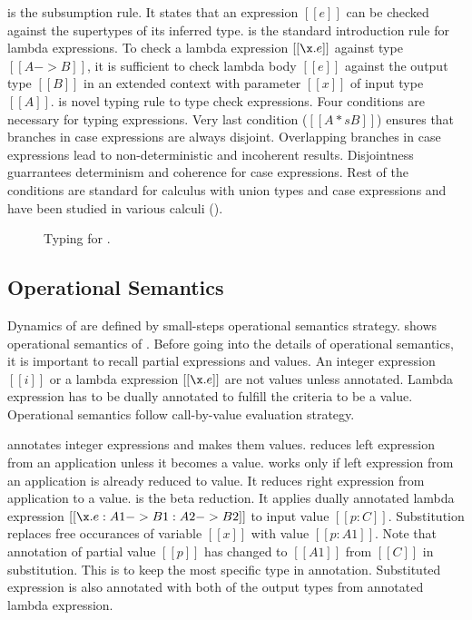  is the subsumption rule. It states that an expression $[[e]]$ can be checked 
against the supertypes of its inferred type. 
 is the standard introduction rule for lambda expressions. To check a
lambda expression $[[\x.e]]$ against type $[[A -> B]]$, it is sufficient to check lambda body $[[e]]$
against the output type $[[B]]$ in an extended context with parameter $[[x]]$ of input type $[[A]]$.
 is novel typing rule to type check \typeof expressions. Four conditions are necessary
for typing \typeof expressions. Very last condition ($[[A *s B]]$) ensures that branches in case 
expressions are always disjoint. Overlapping branches in case expressions lead to non-deterministic
and incoherent results. Disjointness guarrantees determinism and coherence for case expressions.
Rest of the conditions are standard for calculus with union types and case expressions and have been
studied in various calculi ().

\begin{figure}[t]
  \begin{small}
    \centering
  \end{small}
  \caption{Typing for \dut.}
  \label{fig:union:typ}
\end{figure}

\subsection{Operational Semantics}
\label{sec:union:os}
Dynamics of \cal are defined by small-steps operational semantics strategy.  shows
operational semantics of \cal. Before going into the details of operational semantics, it is important
to recall partial expressions and values. An integer expression $[[i]]$ or a lambda expression $[[\x.e]]$
are not values unless annotated. Lambda expression has to be dually annotated to fulfill the criteria to
be a value. Operational semantics follow call-by-value evaluation strategy.

 annotates integer expressions and makes them values.  reduces left expression
from an application unless it becomes a value.  works only if left expression from an
application is already reduced to value. It reduces right expression from application to a value.
 is the beta reduction. It applies dually annotated lambda expression 
$[[\x.e : A1 -> B1 : A2 -> B2]]$ to input value $[[p:C]]$. Substitution replaces free occurances of variable
$[[x]]$ with value $[[p:A1]]$. Note that annotation of partial value $[[p]]$ has changed to $[[A1]]$ from 
$[[C]]$ in substitution. This is to keep the most specific type in annotation. Substituted expression is also
annotated with both of the output types from annotated lambda expression. 

